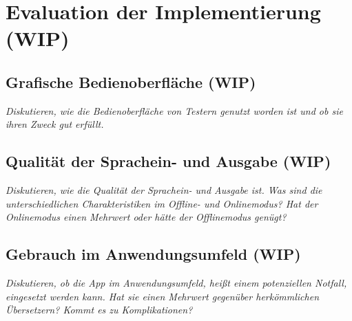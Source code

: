 \newpage
\section{Evaluation der Implementierung (WIP)}\label{sec:evaluation}

\subsection{Grafische Bedienoberfläche (WIP)}
\textit{Diskutieren, wie die Bedienoberfläche von Testern genutzt worden ist und ob sie ihren Zweck gut erfüllt.}

\subsection{Qualität der Sprachein- und Ausgabe (WIP)}
\textit{Diskutieren, wie die Qualität der Sprachein- und Ausgabe ist. Was sind die unterschiedlichen Charakteristiken im Offline- und Onlinemodus? Hat der Onlinemodus einen Mehrwert oder hätte der Offlinemodus genügt?}

\subsection{Gebrauch im Anwendungsumfeld (WIP)}
\textit{Diskutieren, ob die App im Anwendungsumfeld, heißt einem potenziellen Notfall, eingesetzt werden kann. Hat sie einen Mehrwert gegenüber herkömmlichen Übersetzern? Kommt es zu Komplikationen?}